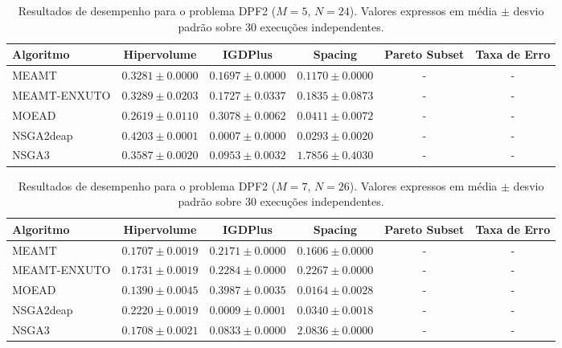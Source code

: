 \begin{table}[htpb]
\centering
\caption{Resultados de desempenho para o problema DPF2 ($M=5$, $N=24$). Valores expressos em média $\pm$ desvio padrão sobre 30 execuções independentes.}
\label{tab:DPF2_M5_N24}
\begin{tabular}{lccccc}
\hline\hline
Algoritmo & Hipervolume & IGDPlus & Spacing & Pareto Subset & Taxa de Erro \\
\hline
MEAMT & $0.3281 \pm 0.0000$ & $0.1697 \pm 0.0000$ & $0.1170 \pm 0.0000$ & - & - \\
MEAMT-ENXUTO & $0.3289 \pm 0.0203$ & $0.1727 \pm 0.0337$ & $0.1835 \pm 0.0873$ & - & - \\
MOEAD & $0.2619 \pm 0.0110$ & $0.3078 \pm 0.0062$ & $0.0411 \pm 0.0072$ & - & - \\
NSGA2deap & $0.4203 \pm 0.0001$ & $0.0007 \pm 0.0000$ & $0.0293 \pm 0.0020$ & - & - \\
NSGA3 & $0.3587 \pm 0.0020$ & $0.0953 \pm 0.0032$ & $1.7856 \pm 0.4030$ & - & - \\
\hline\hline
\end{tabular}
\end{table}

\begin{table}[htpb]
\centering
\caption{Resultados de desempenho para o problema DPF2 ($M=7$, $N=26$). Valores expressos em média $\pm$ desvio padrão sobre 30 execuções independentes.}
\label{tab:DPF2_M7_N26}
\begin{tabular}{lccccc}
\hline\hline
Algoritmo & Hipervolume & IGDPlus & Spacing & Pareto Subset & Taxa de Erro \\
\hline
MEAMT & $0.1707 \pm 0.0019$ & $0.2171 \pm 0.0000$ & $0.1606 \pm 0.0000$ & - & - \\
MEAMT-ENXUTO & $0.1731 \pm 0.0019$ & $0.2284 \pm 0.0000$ & $0.2267 \pm 0.0000$ & - & - \\
MOEAD & $0.1390 \pm 0.0045$ & $0.3987 \pm 0.0035$ & $0.0164 \pm 0.0028$ & - & - \\
NSGA2deap & $0.2220 \pm 0.0019$ & $0.0009 \pm 0.0001$ & $0.0340 \pm 0.0018$ & - & - \\
NSGA3 & $0.1708 \pm 0.0021$ & $0.0833 \pm 0.0000$ & $2.0836 \pm 0.0000$ & - & - \\
\hline\hline
\end{tabular}
\end{table}

